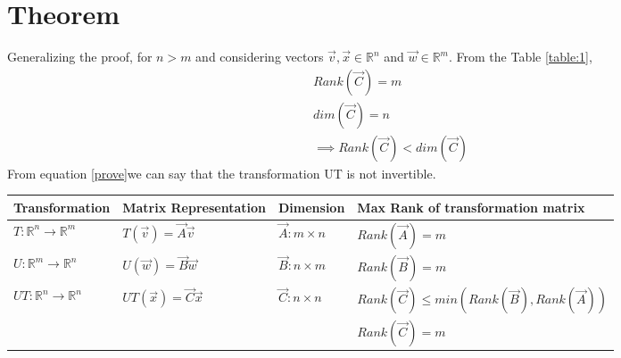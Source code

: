 \documentclass[journal,12pt,twocolumn]{IEEEtran}
\begin{document}
\section{Theorem}
Generalizing the proof, for $n>m$ and considering vectors $\vec{v},\vec{x}\in\mathbb{R}^n$ and $\vec{w}\in\mathbb{R}^m$. From the Table \ref{table:1}, 
\begin{align}
Rank(\vec{C})=m\\
dim(\vec{C})=n\\
\implies Rank(\vec{C})<dim(\vec{C})\label{prove}
\end{align}
From equation \eqref{prove}we can say that the transformation UT is not invertible. 
\begin{table*}[h!]
\begin{center}
\begin{tabular}{|l|l|l|l|}
\hline
\textbf{Transformation}&\textbf{Matrix Representation}&\textbf{Dimension}&\textbf{Max Rank  of transformation matrix}\\[0.5ex]
\hline
$T:\mathbb{R}^n\rightarrow\mathbb{R}^m$ & $T(\vec{v})=\vec{A}\vec{v}$ & $\vec{A}:m\times n$ & $Rank(\vec{A})=m$\\[0.5ex]
\hline
$U:\mathbb{R}^m\rightarrow\mathbb{R}^n$ & $U(\vec{w})=\vec{B}\vec{w}$ & $\vec{B}:n\times m$ & $Rank(\vec{B})=m$\\[0.5ex]
\hline
$UT:\mathbb{R}^n\rightarrow\mathbb{R}^n$ & $UT(\vec{x})=\vec{C}\vec{x}$ & $\vec{C}:n\times n$ & $Rank(\vec{C})\le min(Rank(\vec{B}),Rank(\vec{A}))$\\[0.5ex]
&&&$Rank(\vec{C})=m$\\[0.5ex]
\hline
\end{tabular}
\caption{Generalization of the proof }
\label{table:1}
\end{center}
\vspace{-0.5cm}
\end{table*}
\end{document}
